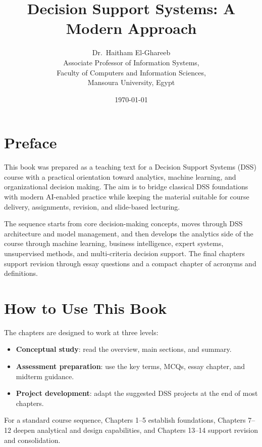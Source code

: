 \documentclass[11pt,oneside]{book}
\title{Decision Support Systems: A Modern Approach}
\author{Dr.\ Haitham El-Ghareeb\\
Associate Professor of Information Systems,\\
Faculty of Computers and Information Sciences,\\
Mansoura University, Egypt}
\date{\today}
\begin{document}
\frontmatter
\maketitle
\tableofcontents

\chapter*{Preface}
This book was prepared as a teaching text for a Decision Support Systems (DSS)
course with a practical orientation toward analytics, machine learning, and
organizational decision making. The aim is to bridge classical DSS foundations
with modern AI-enabled practice while keeping the material suitable for course
delivery, assignments, revision, and slide-based lecturing.

The sequence starts from core decision-making concepts, moves through DSS
architecture and model management, and then develops the analytics side of the
course through machine learning, business intelligence, expert systems,
unsupervised methods, and multi-criteria decision support. The final chapters
support revision through essay questions and a compact chapter of acronyms and
definitions.

\chapter*{How to Use This Book}
The chapters are designed to work at three levels:
\begin{itemize}
  \item \textbf{Conceptual study}: read the overview, main sections, and summary.
  \item \textbf{Assessment preparation}: use the key terms, MCQs, essay chapter,
  and midterm guidance.
  \item \textbf{Project development}: adapt the suggested DSS projects at the end
  of most chapters.
\end{itemize}

For a standard course sequence, Chapters 1--5 establish foundations, Chapters
7--12 deepen analytical and design capabilities, and Chapters 13--14 support
revision and consolidation.

\mainmatter

\end{document}
